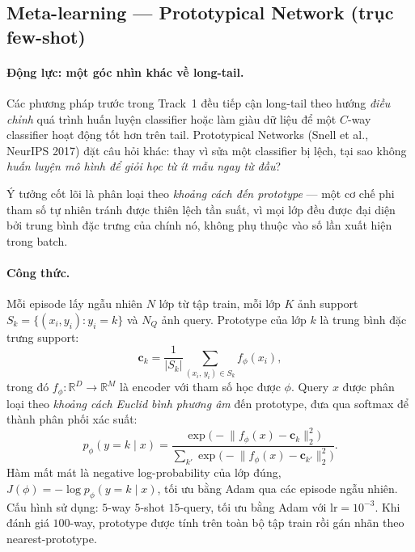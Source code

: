 \subsection{Meta-learning --- Prototypical Network (trục few-shot)}

\paragraph{Động lực: một góc nhìn khác về long-tail.}
Các phương pháp trước trong Track~1 đều tiếp cận long-tail theo hướng
\emph{điều chỉnh} quá trình huấn luyện classifier hoặc làm giàu dữ liệu
để một $C$-way classifier hoạt động tốt hơn trên tail.
Prototypical Networks \cite{snell2017protonet} (Snell et al., NeurIPS 2017)
đặt câu hỏi khác: thay vì sửa một classifier bị lệch,
tại sao không \emph{huấn luyện mô hình để giỏi học từ ít mẫu ngay từ đầu}?

Ý tưởng cốt lõi là phân loại theo \emph{khoảng cách đến prototype} ---
một cơ chế phi tham số tự nhiên tránh được thiên lệch tần suất,
vì mọi lớp đều được đại diện bởi trung bình đặc trưng của chính nó,
không phụ thuộc vào số lần xuất hiện trong batch.

\paragraph{Công thức.}
Mỗi episode lấy ngẫu nhiên $N$ lớp từ tập train,
mỗi lớp $K$ ảnh support $S_k = \{(x_i, y_i) : y_i = k\}$
và $N_Q$ ảnh query.
Prototype của lớp $k$ là trung bình đặc trưng support:
\begin{equation}
    \mathbf{c}_k
    = \frac{1}{|S_k|} \sum_{(x_i,\, y_i) \in S_k} f_\phi(x_i),
    \label{eq:prototype}
\end{equation}
trong đó $f_\phi : \mathbb{R}^D \to \mathbb{R}^M$ là encoder
với tham số học được $\phi$.
Query $x$ được phân loại theo \emph{khoảng cách Euclid bình phương âm}
đến prototype, đưa qua softmax để thành phân phối xác suất:
\begin{equation}
    p_\phi(y = k \mid x)
    = \frac{\exp\!\bigl(-\lVert f_\phi(x) - \mathbf{c}_k \rVert_2^2\bigr)}
           {\displaystyle\sum_{k'}
            \exp\!\bigl(-\lVert f_\phi(x) - \mathbf{c}_{k'} \rVert_2^2\bigr)}.
    \label{eq:proto-classify}
\end{equation}
Hàm mất mát là negative log-probability của lớp đúng,
$J(\phi) = -\log p_\phi(y = k \mid x)$,
tối ưu bằng Adam qua các episode ngẫu nhiên.
Cấu hình sử dụng: $5$-way $5$-shot $15$-query,
tối ưu bằng Adam với $\text{lr} = 10^{-3}$.
Khi đánh giá $100$-way, prototype được tính trên toàn bộ tập train
rồi gán nhãn theo nearest-prototype.

